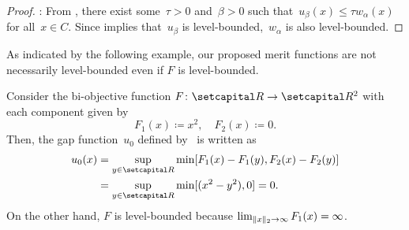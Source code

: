 \documentclass[../main]{subfiles}
\begin{document}
\begin{proof}
    : From , there exist some~$\tau > 0$ and~$\beta > 0$ such that~$u_\beta(x) \le \tau w_\alpha(x)$ for all~$x \in C$.
    Since  implies that~$u_\beta$ is level-bounded,~$w_\alpha$ is also level-bounded.
\end{proof}
As indicated by the following example, our proposed merit functions are not necessarily level-bounded even if $F$ is level-bounded.
\begin{example}
    Consider the bi-objective function $F \colon \setR \to \setR^2$ with each component given by
    \begin{equation}
        F_1(x) \coloneqq x^2, \quad F_2(x) \coloneqq 0.
    \end{equation}
    Then, the gap function~$u_0$ defined by~ is written as
    \begin{align}
        u_0(x) & = \sup_{y \in \setR} \min [ F_1(x) - F_1(y), F_2(x) - F_2(y) ] \\
             & = \sup_{y \in \setR} \min [ (x^2 - y^2), 0 ] = 0.
    \end{align}
    On the other hand, $F$ is level-bounded because $\lim_{\lVert x\rVert_2 \to \infty} F_1(x) = \infty$.
\end{example}
\end{document}
